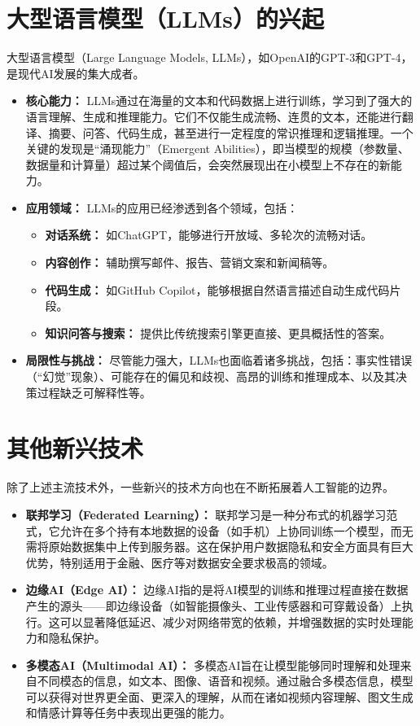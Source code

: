 \section{大型语言模型（LLMs）的兴起}
\label{sec:llms}
大型语言模型（Large Language Models, LLMs），如OpenAI的GPT-3和GPT-4，是现代AI发展的集大成者。
\begin{itemize}
    \item \textbf{核心能力：} LLMs通过在海量的文本和代码数据上进行训练，学习到了强大的语言理解、生成和推理能力。它们不仅能生成流畅、连贯的文本，还能进行翻译、摘要、问答、代码生成，甚至进行一定程度的常识推理和逻辑推理。一个关键的发现是“涌现能力”（Emergent Abilities），即当模型的规模（参数量、数据量和计算量）超过某个阈值后，会突然展现出在小模型上不存在的新能力。
    \item \textbf{应用领域：} LLMs的应用已经渗透到各个领域，包括：
        \begin{itemize}
            \item \textbf{对话系统：} 如ChatGPT，能够进行开放域、多轮次的流畅对话。
            \item \textbf{内容创作：} 辅助撰写邮件、报告、营销文案和新闻稿等。
            \item \textbf{代码生成：} 如GitHub Copilot，能够根据自然语言描述自动生成代码片段。
            \item \textbf{知识问答与搜索：} 提供比传统搜索引擎更直接、更具概括性的答案。
        \end{itemize}
    \item \textbf{局限性与挑战：} 尽管能力强大，LLMs也面临着诸多挑战，包括：事实性错误（“幻觉”现象）、可能存在的偏见和歧视、高昂的训练和推理成本、以及其决策过程缺乏可解释性等。
\end{itemize}

\section{其他新兴技术}
\label{sec:emerging_tech}
除了上述主流技术外，一些新兴的技术方向也在不断拓展着人工智能的边界。
\begin{itemize}
    \item \textbf{联邦学习（Federated Learning）：} 联邦学习是一种分布式的机器学习范式，它允许在多个持有本地数据的设备（如手机）上协同训练一个模型，而无需将原始数据集中上传到服务器。这在保护用户数据隐私和安全方面具有巨大优势，特别适用于金融、医疗等对数据安全要求极高的领域。
    \item \textbf{边缘AI（Edge AI）：} 边缘AI指的是将AI模型的训练和推理过程直接在数据产生的源头——即边缘设备（如智能摄像头、工业传感器和可穿戴设备）上执行。这可以显著降低延迟、减少对网络带宽的依赖，并增强数据的实时处理能力和隐私保护。
    \item \textbf{多模态AI（Multimodal AI）：} 多模态AI旨在让模型能够同时理解和处理来自不同模态的信息，如文本、图像、语音和视频。通过融合多模态信息，模型可以获得对世界更全面、更深入的理解，从而在诸如视频内容理解、图文生成和情感计算等任务中表现出更强的能力。
\end{itemize}

